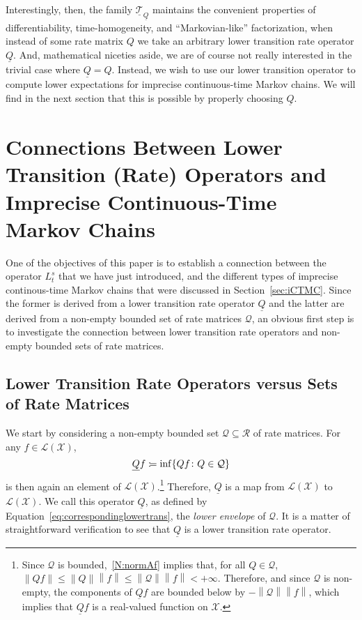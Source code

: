 \documentclass[10pt,a4paper]{paper}
\theoremstyle{definition}
\newcommand{\states}{\mathcal{X}}
\newcommand{\lbound}{L}
\newcommand{\gambles}{\mathcal{L}}
\newcommand{\gamblesX}{\gambles(\states)}
\newcommand{\rateset}{\mathcal{Q}}
\newcommand{\lrate}{\underline{Q}}
\newcommand{\norm}[1]{\left\lVert #1 \right\rVert}
\newcommand{\coloneqq}{:\!=}
\begin{document}
Interestingly, then, the family $\underline{\mathcal{T}}_{\lrate}$ maintains the convenient properties of differentiability, time-homogeneity, and ``Markovian-like'' factorization, when instead of some rate matrix $Q$ we take an arbitrary lower transition rate operator $\lrate$. And, mathematical niceties aside, we are of course not really interested in the trivial case where $\lrate=Q$. Instead, we wish to use our lower transition operator to compute lower expectations for imprecise continuous-time Markov chains. We will find in the next section that this is possible by properly choosing $\lrate$.

\section{Connections Between Lower Transition (Rate) Operators and Imprecise Continuous-Time Markov Chains}\label{sec:connections}

One of the objectives of this paper is to establish a connection between the operator $\lbound_t^s$ that we have just introduced, and the different types of imprecise continous-time Markov chains that were discussed in Section~\ref{sec:iCTMC}. Since the former is derived from a lower transition rate operator $\lrate$ and the latter are derived from a non-empty bounded set of rate matrices $\rateset$, an obvious first step is to investigate the connection between lower transition rate operators and non-empty bounded sets of rate matrices.

\subsection{Lower Transition Rate Operators versus Sets of Rate Matrices}\label{sec:connections_rate}


We start by considering a non-empty bounded set $\rateset\subseteq\mathcal{R}$ of rate matrices. For any $f\in\gamblesX$,
\begin{equation}\label{eq:correspondinglowertrans}
\lrate f\coloneqq\inf\{Qf\colon Q\in\rateset\}\\[2mm]
\end{equation}
is then again an element of $\gamblesX$.\footnote{%
Since $\rateset$ is bounded,~\ref{N:normAf} implies that, for all $Q\in\rateset$, $\norm{Qf}\leq\norm{Q}\norm{f}\leq\norm{\rateset}\norm{f}<+\infty$. Therefore, and since $\rateset$ is non-empty, the components of $\lrate f$ are bounded below by $-\norm{\rateset}\norm{f}$, which implies that $\lrate f$ is a real-valued function on $\states$.}
Therefore, $\lrate$ is a map from $\gamblesX$ to $\gamblesX$. We call this operator $\lrate$, as defined by Equation~\eqref{eq:correspondinglowertrans}, the \emph{lower envelope} of $\rateset$. It is a matter of straightforward verification to see that $\lrate$ is a lower transition rate operator.
\end{document}
